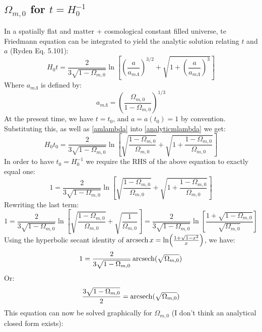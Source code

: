 \subsection{$\Omega_{m, 0}$ for $t = H_0^{-1}$}
In a spatially flat and matter + cosmological constant filled universe, te Friedmann equation can be integrated to yield the analytic solution relating $t$ and $a$ (Ryden Eq. 5.101):
\begin{equation}\label{analyticmlambda}
    H_0t = \frac{2}{3\sqrt{1 - \Omega_{m, 0}}}\ln\left[\left(\frac{a}{a_{m\Lambda}}\right)^{3/2} + \sqrt{1 + \left(\frac{a}{a_{m\Lambda}}\right)^3}\right]
\end{equation}
Where $a_{m\Lambda}$ is defined by:
\begin{equation}\label{amlambda}
    a_{m\Lambda} = \left(\frac{\Omega_{m,0}}{1 - \Omega_{m, 0}}\right)^{1/3}
\end{equation}
At the present time, we have $t = t_0$, and $a = a(t_0) = 1$ by convention. Substituting this, as well as \eqref{amlambda} into \eqref{analyticmlambda} we get:
\begin{equation}
    H_0t_0 = \frac{2}{3\sqrt{1 - \Omega_{m, 0}}}\ln\left[\sqrt{\frac{1-\Omega_{m, 0}}{\Omega_{m, 0}}} + \sqrt{1 + \frac{1-\Omega_{m, 0}}{\Omega_{m, 0}}}\right]
\end{equation}
In order to have $t_0 = H_0^{-1}$ we require the RHS of the above equation to exactly equal one:
\begin{equation}
    1 = \frac{2}{3\sqrt{1 - \Omega_{m, 0}}}\ln\left[\sqrt{\frac{1-\Omega_{m, 0}}{\Omega_{m, 0}}} + \sqrt{1 + \frac{1-\Omega_{m, 0}}{\Omega_{m, 0}}}\right]
\end{equation}
Rewriting the last term:
\begin{equation}
    1 = \frac{2}{3\sqrt{1 - \Omega_{m, 0}}}\ln\left[\sqrt{\frac{1-\Omega_{m, 0}}{\Omega_{m, 0}}} + \sqrt{\frac{1}{\Omega_{m, 0}}}\right] = \frac{2}{3\sqrt{1 - \Omega_{m, 0}}}\ln\left[\frac{1 + \sqrt{1 - \Omega_{m, 0}}}{\sqrt{\Omega_{m, 0}}}\right]
\end{equation}
Using the hyperbolic secant identity of $\operatorname{arcsech} x = \ln(\frac{1 + \sqrt{1 - x^2}}{x})$, we have:
\begin{equation}
    1 = \frac{2}{3\sqrt{1 - \Omega_{m, 0}}}\operatorname{arcsech}(\sqrt{\Omega_{m, 0}})
\end{equation}
Or:
\begin{equation}\label{59exp}
    \frac{3\sqrt{1 - \Omega_{m, 0}}}{2} = \operatorname{arcsech}(\sqrt{\Omega_{m, 0}})
\end{equation}
This equation can now be solved graphically for $\Omega_{m, 0}$ (I don't think an analytical closed form exists):
